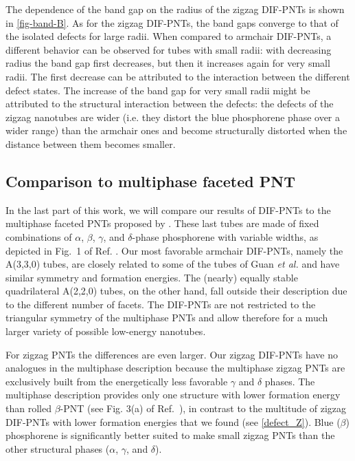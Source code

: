 The dependence of the band gap on the radius of the zigzag DIF-PNTs is shown in \autoref{fig-band-B}. As for the zigzag DIF-PNTs, the band gaps converge to that of the isolated defects for large radii. When compared to armchair DIF-PNTs, a different behavior can be observed for tubes with small radii: with decreasing radius the band gap first decreases, but then it increases again for very small radii. The first decrease can be attributed to the interaction between the different defect states. The increase of the band gap for very small radii might be attributed to the structural interaction between the defects: the defects of the zigzag nanotubes are wider (i.e. they distort the blue phosphorene phase over a wider range) than the armchair ones and become structurally distorted when the distance between them becomes smaller.

\subsection{Comparison to multiphase faceted PNT}
In the last part of this work, we will compare our results of DIF-PNTs to the multiphase faceted PNTs proposed by \citet{Guan2014a}. These last tubes are made of fixed combinations of $\alpha$, $\beta$, $\gamma$, and $\delta$-phase phosphorene with variable widths, as depicted in Fig.~1 of Ref. \cite{Guan2014a}. Our most favorable armchair DIF-PNTs, namely the A(3,3,0) tubes, are closely related to some of the tubes of Guan \textit{et al.} and have similar symmetry and formation energies. The (nearly) equally stable quadrilateral A(2,2,0) tubes, on the other hand, fall outside their description due to the different number of facets. The DIF-PNTs are not restricted to the triangular symmetry of the multiphase PNTs and allow therefore for a much larger variety of possible low-energy nanotubes. 

For zigzag PNTs the differences are even larger. Our zigzag DIF-PNTs have no analogues in the multiphase description because the multiphase zigzag PNTs are exclusively built from the energetically  less favorable $\gamma$ and $\delta$ phases. The multiphase description provides only one structure with lower formation energy than rolled $\beta$-PNT (see Fig. 3(a) of Ref.~\cite{Guan2014a}), in contrast to the multitude of zigzag DIF-PNTs with lower formation energies that we found (see \autoref{defect_Z}). Blue ($\beta$) phosphorene is significantly better suited to make small zigzag PNTs than the other structural phases ($\alpha$, $\gamma$, and $\delta$).

